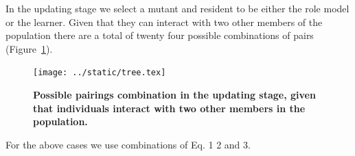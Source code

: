\documentclass[11pt]{article}
\theoremstyle{plainCl1}
\theoremstyle{plainCl2}
\begin{document}
In the updating stage we select a mutant and resident to be either the role
model or the learner. Given that they can interact with two other members of the
population there are a total of twenty four possible combinations of pairs
(Figure~\ref{fig:pissible_two_pairs}).

\begin{figure}[!htbp]
  \centering
  \texttt{[image: ../static/tree.tex]}
  \caption{\textbf{Possible pairings combination in the updating stage, given
  that individuals interact with two other members in the population.}}
  \label{fig:pissible_two_pairs}
\end{figure}

For the above cases we use combinations of Eq. 1 2 and 3.
\end{document}
